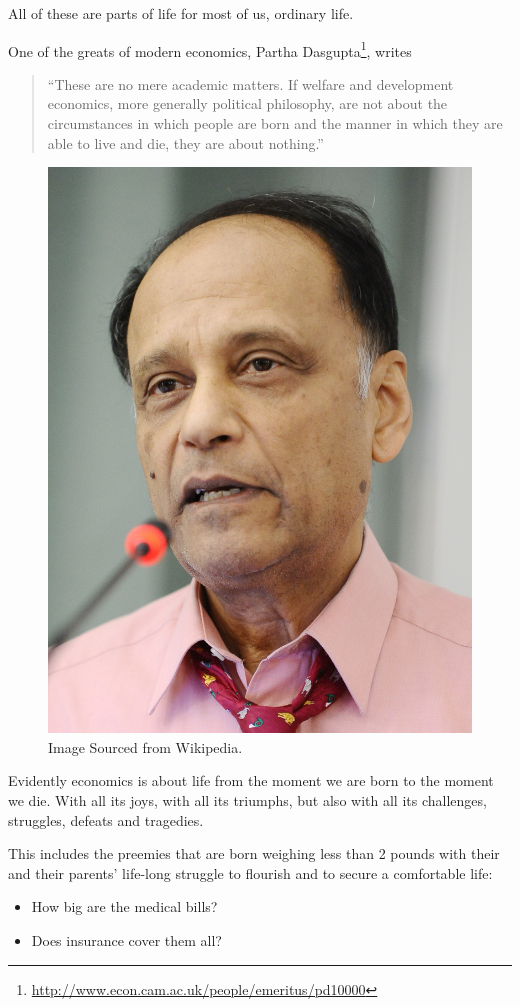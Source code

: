 \documentclass[
]{book}
\providecommand{\tightlist}{%
  \setlength{\itemsep}{0pt}\setlength{\parskip}{0pt}}
\begin{document}
All of these are parts of life for most of us, ordinary life.

One of the greats of modern economics, Partha Dasgupta\footnote{\url{http://www.econ.cam.ac.uk/people/emeritus/pd10000}}, writes

\begin{quote}
``These are no mere academic matters. If welfare and development economics, more generally political philosophy, are not about the circumstances in which people are born and the manner in which they are able to live and die, they are about nothing.''
\end{quote}

\begin{figure}

{\centering \includegraphics[width=0.5\linewidth]{img/intro/Partha_Dasgupta} 

}

\caption{Image Sourced from Wikipedia.}\label{fig:intro03}
\end{figure}

Evidently economics is about life from the moment we are born to the moment we die. With all its joys, with all its triumphs, but also with all its challenges, struggles, defeats and tragedies.

This includes the preemies that are born weighing less than 2 pounds with their and their parents' life-long struggle to flourish and to secure a comfortable life:

\begin{itemize}
\tightlist
\item
  How big are the medical bills?
\item
  Does insurance cover them all?
\end{itemize}
\end{document}
